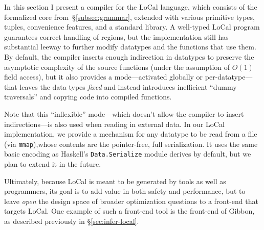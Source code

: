 \documentclass[showabstract,showacknowledgments,showpreface,showdedication,school]{iuphd}
\theoremstyle{nonumberplain}
\newcommand{\sysname}[0]{LoCal\xspace}
\newcommand{\ourcalc}[0]{\sysname}
\newcommand{\secref}[1]{\S\ref{#1}}
\newcommand{\il}[1]{\lstinline[style=inline,mathescape=true];#1;}
\begin{document}
In this section I present a compiler for the \ourcalc language, which consists of
the formalized core from~\secref{subsec:grammar}, extended with various primitive types, tuples,
convenience features, and a standard library.
A well-typed \ourcalc program guarantees correct handling of regions, but the
implementation still has substantial leeway to further modify datatypes and
the functions that use them.
By default, the compiler inserts enough indirection in
datatypes to preserve the asymptotic complexity of the source functions (under
the assumption of $O(1)$ field access), but it also provides a mode---activated
globally or per-datatype---that leaves the data types
\emph{fixed} and instead introduces inefficient ``dummy traversals'' and copying
code into compiled functions.

{Note that this ``inflexible'' mode---which doesn't allow the compiler to
  insert indirections---is also used when reading in external data.  In our
  \ourcalc implementation, we provide a mechanism for any datatype to be read
  from a file (via \il{mmap}),whose contents are the pointer-free, full
  serialization.  It uses the same basic encoding as Haskell's
  \il{Data.Serialize} module derives by default, but we plan to extend it in the
  future.}

Ultimately, because \ourcalc is meant to be generated by tools as well as programmers,
its goal is to add value in both safety and performance, but to leave
\emph{open} the design space of broader optimization questions to a front-end that
targets \ourcalc{}. One example of such a front-end tool is the front-end of
Gibbon, as described previously in \secref{sec:infer-local}.
\end{document}
